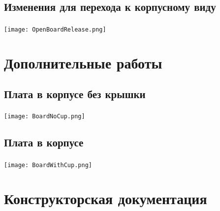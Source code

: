 \documentclass[c]{beamer}  %
\begin{document}
\subsection{Изменения для перехода к корпусному виду}

	\begin{frame}
		\frametitle{\insertsection}
		\framesubtitle{\insertsubsection}
		\centering
		\texttt{[image: OpenBoardRelease.png]}
	\end{frame}

\section{Дополнительные работы}
\subsection{Плата в корпусе без крышки}
	
	\begin{frame}
		\frametitle{\insertsection}
		\framesubtitle{\insertsubsection}
		\centering
		\texttt{[image: BoardNoCup.png]}		
	\end{frame}

\subsection{Плата в корпусе}

	\begin{frame}
		\frametitle{\insertsection}
		\framesubtitle{\insertsubsection}
		\centering
		\texttt{[image: BoardWithCup.png]}		
	\end{frame}

\section{Конструкторская документация}
\end{document}
